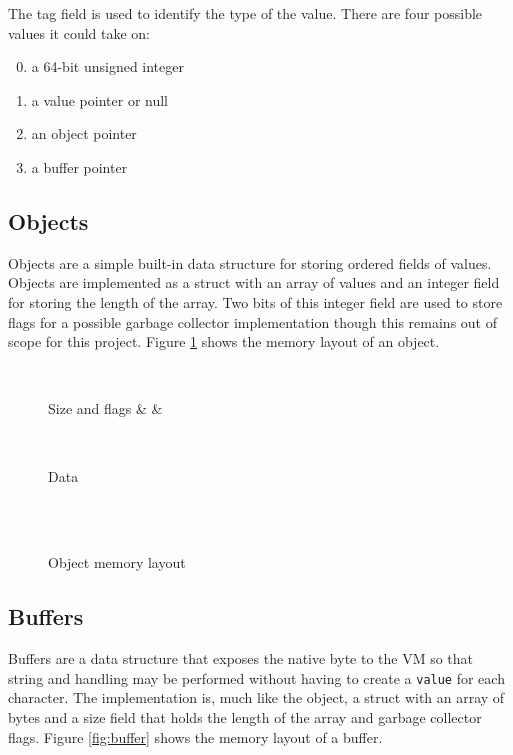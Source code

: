 \documentclass[english,a4paper,12pt]{report}
\begin{document}
The tag field is used to identify the type of the value. There are
four possible values it could take on:
\begin{enumerate}
	\setcounter{enumi}{-1}
	\item a 64-bit unsigned integer
	\item a value pointer or null
	\item an object pointer \setcounter{enumi}{3}
	\item a buffer pointer
\end{enumerate}

\subsection{Objects}

Objects are a simple built-in data structure for storing ordered
fields of values. Objects are implemented as a struct with an array of
values and an integer field for storing the length of the array. Two
bits of this integer field are used to store flags for a possible
garbage collector implementation though this remains out of scope for
this project. Figure \ref{fig:objmem} shows the memory layout of an
object.

\begin{figure}[!htb]
	\centering
	\begin{bytefield}[bitwidth=0.3em,endianness=big]{64}
		 \\
		\begin{rightwordgroup}{Size and flags}
			 & \bitbox{1}{} & 
		\end{rightwordgroup} \\
		
		\begin{rightwordgroup}{Data}
				\\
			 \\[1ex]
		\end{rightwordgroup} \\
	\end{bytefield}
	\caption{Object memory layout}
	\label{fig:objmem}
\end{figure}

\subsection{Buffers}

Buffers are a data structure that exposes the native byte to the VM so
that string and handling may be performed without having to create a
\verb|value| for each character. The implementation is, much like the
object, a struct with an array of bytes and a size field that holds
the length of the array and garbage collector
flags. Figure \ref{fig:buffer} shows the memory layout of a buffer.
\end{document}
